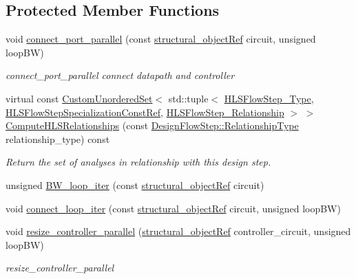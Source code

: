 \subsection*{Protected Member Functions}
\begin{DoxyCompactItemize}
\item 
void \hyperlink{classtop__entity__parallel__cs_ae9f5f5887e789f3abb4ee2786f6f9980}{connect\+\_\+port\+\_\+parallel} (const \hyperlink{structural__objects_8hpp_a8ea5f8cc50ab8f4c31e2751074ff60b2}{structural\+\_\+object\+Ref} circuit, unsigned loop\+BW)
\begin{DoxyCompactList}\small\item\em connect\+\_\+port\+\_\+parallel connect datapath and controller \end{DoxyCompactList}\item 
virtual const \hyperlink{classCustomUnorderedSet}{Custom\+Unordered\+Set}$<$ std\+::tuple$<$ \hyperlink{hls__step_8hpp_ada16bc22905016180e26fc7e39537f8d}{H\+L\+S\+Flow\+Step\+\_\+\+Type}, \hyperlink{hls__step_8hpp_a5fdd2edf290c196531d21d68e13f0e74}{H\+L\+S\+Flow\+Step\+Specialization\+Const\+Ref}, \hyperlink{hls__step_8hpp_a3ad360b9b11e6bf0683d5562a0ceb169}{H\+L\+S\+Flow\+Step\+\_\+\+Relationship} $>$ $>$ \hyperlink{classtop__entity__parallel__cs_a619b309604994e682d4f2c4f0989efde}{Compute\+H\+L\+S\+Relationships} (const \hyperlink{classDesignFlowStep_a723a3baf19ff2ceb77bc13e099d0b1b7}{Design\+Flow\+Step\+::\+Relationship\+Type} relationship\+\_\+type) const
\begin{DoxyCompactList}\small\item\em Return the set of analyses in relationship with this design step. \end{DoxyCompactList}\item 
unsigned \hyperlink{classtop__entity__parallel__cs_ab027d23496745ebc6f32b29cafa10759}{B\+W\+\_\+loop\+\_\+iter} (const \hyperlink{structural__objects_8hpp_a8ea5f8cc50ab8f4c31e2751074ff60b2}{structural\+\_\+object\+Ref} circuit)
\item 
void \hyperlink{classtop__entity__parallel__cs_ac1a4001c3ec07d0ccda26536fe1a9326}{connect\+\_\+loop\+\_\+iter} (const \hyperlink{structural__objects_8hpp_a8ea5f8cc50ab8f4c31e2751074ff60b2}{structural\+\_\+object\+Ref} circuit, unsigned loop\+BW)
\item 
void \hyperlink{classtop__entity__parallel__cs_a4a20b499f50503abb100d7e714db9b9a}{resize\+\_\+controller\+\_\+parallel} (\hyperlink{structural__objects_8hpp_a8ea5f8cc50ab8f4c31e2751074ff60b2}{structural\+\_\+object\+Ref} controller\+\_\+circuit, unsigned loop\+BW)
\begin{DoxyCompactList}\small\item\em resize\+\_\+controller\+\_\+parallel \end{DoxyCompactList}\end{DoxyCompactItemize}
